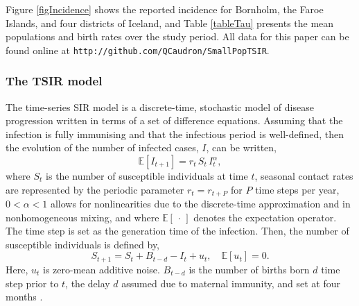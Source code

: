 \documentclass[10pt]{article}
\begin{document}
Figure \ref{figIncidence} shows the reported incidence for Bornholm, the Faroe Islands, and four districts of Iceland, and Table \ref{tableTau} presents the mean populations and birth rates over the study period. All data for this paper can be found online at \texttt{http://github.com/QCaudron/SmallPopTSIR}.










\subsubsection*{The TSIR model}

The time-series SIR model \cite{Finkenstadt2000} is a discrete-time, stochastic model of disease progression written in terms of a set of difference equations. Assuming that the infection is fully immunising and that the infectious period is well-defined, then the evolution of the number of infected cases, $I$, can be written,
\begin{equation}
\mathbb{E}\left[I_{t+1}\right] = r_t \, S_t \, I_t^\alpha,
\label{TSIR_I}
\end{equation}
where $S_t$ is the number of susceptible individuals at time $t$, seasonal contact rates are represented by the periodic parameter $r_t = r_{t+P}$ for $P$ time steps per year, $0 < \alpha < 1$ allows for nonlinearities due to the discrete-time approximation and in nonhomogeneous mixing, and where $\mathbb{E}\left[\,\cdot\,\right]$ denotes the expectation operator. The time step is set as the generation time of the infection. Then, the number of susceptible individuals is defined by,
\begin{equation}
S_{t+1} = S_t + B_{t-d} - I_t + u_t, \quad \mathbb{E}\left[u_t\right] = 0.
\label{TSIR_S}
\end{equation}
Here, $u_t$ is  zero-mean additive noise. $B_{t-d}$ is the number of births born $d$ time step prior to $t$, the delay $d$ assumed due to maternal immunity, and set at four months \cite{Anderson1991}.
\end{document}

